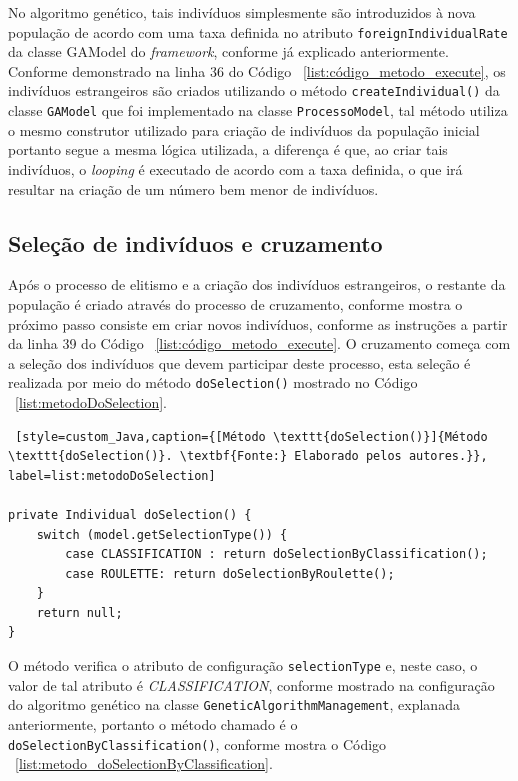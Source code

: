 \par No algoritmo genético, tais indivíduos simplesmente são introduzidos à nova população de acordo com uma taxa definida no 
atributo \texttt{foreignIndividualRate} da classe GAModel do \textit{framework}, conforme já explicado anteriormente. Conforme 
demonstrado na linha 36 do Código ~\ref{list:código_metodo_execute}, os indivíduos estrangeiros são criados utilizando o método \texttt{createIndividual()} da classe \texttt{GAModel} que foi implementado na classe \texttt{ProcessoModel}, 
tal método utiliza o mesmo construtor utilizado para criação de indivíduos da população inicial portanto segue a mesma lógica utilizada, a diferença é que, ao criar tais indivíduos, o \textit{looping} é executado de acordo com a taxa definida, o que irá resultar na criação de um número bem menor de indivíduos.

\subsection{Seleção de indivíduos e cruzamento} 

\par Após o processo de elitismo e a criação dos indivíduos estrangeiros, o restante da população é criado através do processo
de cruzamento, conforme mostra  o próximo passo consiste em criar novos indivíduos, conforme as instruções a partir da linha 39
do Código ~\ref{list:código_metodo_execute}. O cruzamento começa com a seleção dos indivíduos que devem participar deste processo, 
esta seleção é realizada por meio do método \texttt{doSelection()} mostrado no Código ~\ref{list:metodoDoSelection}.

\begin{lstlisting} [style=custom_Java,caption={[Método \texttt{doSelection()}]{Método \texttt{doSelection()}. \textbf{Fonte:} Elaborado pelos autores.}}, label=list:metodoDoSelection] 

private Individual doSelection() {
	switch (model.getSelectionType()) {
		case CLASSIFICATION : return doSelectionByClassification();
		case ROULETTE: return doSelectionByRoulette();
	}
	return null;
}

\end{lstlisting}

\par O método verifica o atributo de configuração \texttt{selectionType} e, neste caso, o valor de tal atributo é 
\textit{CLASSIFICATION}, conforme mostrado na configuração do algoritmo genético na classe \texttt{GeneticAlgorithmManagement}, 
explanada anteriormente, portanto o método chamado é o \texttt{doSelectionByClassification()}, conforme mostra o Código
~\ref{list:metodo_doSelectionByClassification}.

